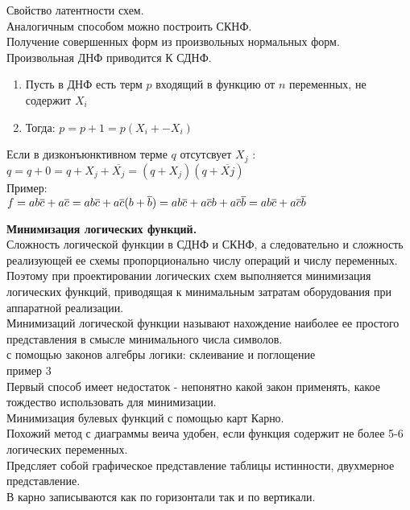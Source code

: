 Свойство латентности схем.\\
Аналогичным способом можно построить СКНФ.\\
Получение совершенных форм из произвольных нормальных форм.\\
Произвольная ДНФ приводится К СДНФ.\\
\begin{enumerate}
  \item Пусть в ДНФ есть терм $p$ входящий в функцию от $n$ переменных, не содержит $X_i$
  \item Тогда: $p = p +1 = p(X_i + -X_i)$
\end{enumerate}
Если в дизконъюнктивном терме $q$ отсутсвует $X_j$ :\\
$q = q+ 0= q +X_j + \overline{X_j} =( q+ X_j) (q + \overline{Xj})$\\
Пример: \\
$
f = ab\overline{c} + a\overline{c} \\
=ab\overline{c} + a\overline{c}(b + \overline{b}) \\
=ab\overline{c} +  a\overline{c}b +  a\overline{c}\overline{b}\\
=ab\overline{c} +  a\overline{c}\overline{b}
$


\Large{ \textbf {Минимизация логических функций.}}\\
Сложность логической функции в СДНФ и СКНФ, а следовательно и сложность реализующей ее схемы пропорционально числу операций и числу переменных.
Поэтому при проектировании логических схем выполняется минимизация логических функций,
приводящая к минимальным затратам оборудования при аппаратной реализации.\\
Минимизаций логической функции называют нахождение наиболее ее простого представления в смысле минимального числа символов.\\
с помощью законов алгебры логики: склеивание и поглощение\\
пример 3\\
Первый способ имеет недостаток - непонятно какой закон применять, какое тождество использовать для минимизации.\\
Минимизация булевых функций с помощью карт Карно.\\
Похожий метод с диаграммы веича удобен, если функция содержит не более 5-6 логических переменных.\\
Предсляет собой графическое представление таблицы истинности, двухмерное представление.\\
В карно записываются как по горизонтали так и по вертикали.\\

